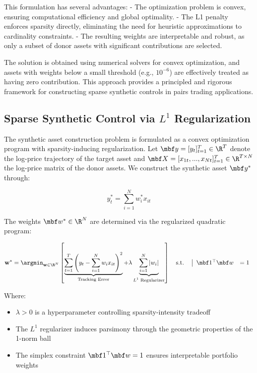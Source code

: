 This formulation has several advantages:
- The optimization problem is convex, ensuring computational efficiency and global optimality.
- The L1 penalty enforces sparsity directly, eliminating the need for heuristic approximations to cardinality constraints.
- The resulting weights are interpretable and robust, as only a subset of donor assets with significant contributions are selected.

The solution is obtained using numerical solvers for convex optimization, and assets with weights below a small threshold (e.g., $10^{-6}$) are effectively treated as having zero contribution. This approach provides a principled and rigorous framework for constructing sparse synthetic controls in pairs trading applications.



\subsection{Sparse Synthetic Control via \texorpdfstring{$L^1$}{L1} Regularization}

The synthetic asset construction problem is formulated as a convex optimization program with sparsity-inducing regularization. Let $\mbf y = [y_{t}]_{t=1}^T\in \R^{T}$ denote the log-price trajectory of the target asset and $\mbf X = [x_{1t}, ..., x_{Nt}]_{t=1}^T\in\R^{T\times N}$ the log-price matrix of the donor assets. We construct the synthetic asset $\mbf y^*$ through:

\begin{equation*}
{y}_{t}^* = \sum_{i=1}^N w_i^* x_{it}
\end{equation*}

The weights $\mbf w^*\in \R^N$ are determined via the regularized quadratic program:

\begin{equation*}
\mathbf{w}^* = \argmin_{\mathbf{w} \in \R^{N}} \left[ \underbrace{\sum_{t=1}^T \left(y_{t} - \sum_{i=1}^N w_i x_{it}\right)^2}_{\text{Tracking Error}} + \lambda \underbrace{\sum_{i=1}^N |w_i|}_{\text{$L^1$ Regularizer}} \right]
\quad \text{s.t.} \quad 
\left|
\begin{array}{ll}
	\mbf 1^\top \mbf w &= 1 
\end{array}
\right.
\end{equation*}

Where:
\begin{itemize}
\item $\lambda > 0$ is a hyperparameter controlling sparsity-intensity tradeoff
\item The $L^1$ regularizer induces parsimony through the geometric properties of the 1-norm ball
\item The simplex constraint $\mbf 1^\top \mbf w = 1$ ensures interpretable portfolio weights
\end{itemize}

